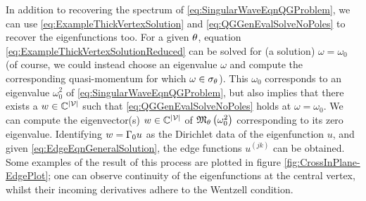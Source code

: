 In addition to recovering the spectrum of \eqref{eq:SingularWaveEqnQGProblem}, we can use \eqref{eq:ExampleThickVertexSolution} and \eqref{eq:QGGenEvalSolveNoPoles} to recover the eigenfunctions too.
For a given $\theta$, equation \eqref{eq:ExampleThickVertexSolutionReduced} can be solved for (a solution) $\omega=\omega_0$ (of course, we could instead choose an eigenvalue $\omega$ and compute the corresponding quasi-momentum for which $\omega\in\sigma_{\theta}$).
This $\omega_0$ corresponds to an eigenvalue $\omega_0^2$ of \eqref{eq:SingularWaveEqnQGProblem}, but also implies that there exists a $w\in\mathbb{C}^{\left\lvert \mathcal{V} \right\rvert}$ such that \eqref{eq:QGGenEvalSolveNoPoles} holds at $\omega=\omega_0$.
We can compute the eigenvector(s) $w\in\mathbb{C}^{\left\lvert \mathcal{V} \right\rvert}$ of $\mathfrak{M}_{\theta}\left( \omega_0^2 \right)$ corresponding to its zero eigenvalue.
Identifying $w = \Gamma_0 u$ as the Dirichlet data of the eigenfunction $u$, and given \eqref{eq:EdgeEqnGeneralSolution}, the edge functions $u^{(jk)}$ can be obtained.
Some examples of the result of this process are plotted in figure \ref{fig:CrossInPlane-EdgePlot}; one can observe continuity of the eigenfunctions at the central vertex, whilst their incoming derivatives adhere to the Wentzell condition.
